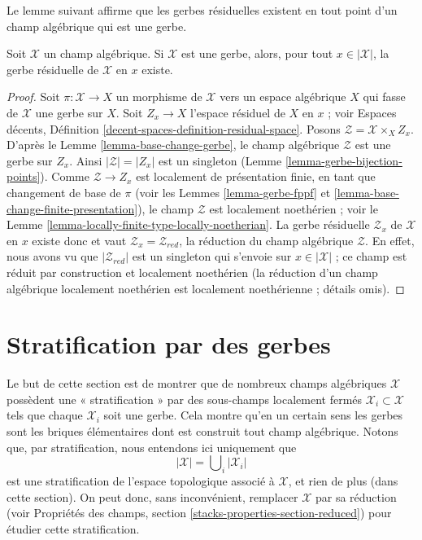 \noindent
Le lemme suivant affirme que les gerbes résiduelles existent en tout point
d'un champ algébrique qui est une gerbe.

\begin{lemma}
\label{lemma-gerbe-residual-gerbe-exists}
Soit $\mathcal{X}$ un champ algébrique. Si $\mathcal{X}$ est une gerbe, alors,
pour tout $x \in |\mathcal{X}|$, la gerbe résiduelle de $\mathcal{X}$ en $x$
existe.
\end{lemma}

\begin{proof}
Soit $\pi : \mathcal{X} \to X$ un morphisme de $\mathcal{X}$ vers un espace
algébrique $X$ qui fasse de $\mathcal{X}$ une gerbe sur $X$. Soit
$Z_x \to X$ l'espace résiduel de $X$ en $x$ ; voir Espaces décents, Définition
\ref{decent-spaces-definition-residual-space}. Posons
$\mathcal{Z} = \mathcal{X} \times_X Z_x$. D'après le
Lemme \ref{lemma-base-change-gerbe}, le champ algébrique $\mathcal{Z}$ est une
gerbe sur $Z_x$. Ainsi $|\mathcal{Z}| = |Z_x|$ est un singleton
(Lemme \ref{lemma-gerbe-bijection-points}). Comme
$\mathcal{Z} \to Z_x$ est localement de présentation finie, en tant que
changement de base de $\pi$ (voir les Lemmes \ref{lemma-gerbe-fppf} et
\ref{lemma-base-change-finite-presentation}), le champ $\mathcal{Z}$ est
localement noethérien ; voir le
Lemme \ref{lemma-locally-finite-type-locally-noetherian}. La gerbe résiduelle
$\mathcal{Z}_x$ de $\mathcal{X}$ en $x$ existe donc et vaut
$\mathcal{Z}_x = \mathcal{Z}_{red}$, la réduction du champ algébrique
$\mathcal{Z}$. En effet, nous avons vu que $|\mathcal{Z}_{red}|$ est un
singleton qui s'envoie sur $x \in |\mathcal{X}|$ ; ce champ est réduit par
construction et localement noethérien (la réduction d'un champ algébrique
localement noethérien est localement noethérienne ; détails omis).
\end{proof}









\section{Stratification par des gerbes}
\label{section-stratify}

\noindent
Le but de cette section est de montrer que de nombreux champs algébriques
$\mathcal{X}$ possèdent une « stratification » par des sous-champs
localement fermés $\mathcal{X}_i \subset \mathcal{X}$ tels que chaque
$\mathcal{X}_i$ soit une gerbe. Cela montre qu'en un certain sens les gerbes
sont les briques élémentaires dont est construit tout champ algébrique.
Notons que, par stratification, nous entendons ici uniquement que
$$
|\mathcal{X}| = \bigcup\nolimits_i |\mathcal{X}_i|
$$
est une stratification de l'espace topologique associé à $\mathcal{X}$,
et rien de plus (dans cette section). On peut donc, sans inconvénient,
remplacer $\mathcal{X}$ par sa réduction (voir Propriétés des champs,
section \ref{stacks-properties-section-reduced}) pour étudier cette
stratification.

